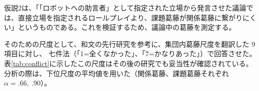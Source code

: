 \documentclass[11pt, a4paper]{jreport} %
\begin{document}




仮説2は、「「ロボットへの助言者」として指定された立場から発言させた議論では、直接立場を指定されるロールプレイより、課題葛藤が関係葛藤に繋がりにくい」というものである。これを検証するため、議論中の葛藤を測定する。

そのための尺度として、和文の先行研究\cite{村山綾20141203}を参考に、集団内葛藤尺度\cite{jehn}を翻訳した
9項目に対し、
七件法（「1=全くなかった」、「7=かなりあった」）で回答させた。表\ref{tab:conflict}に示したこの尺度はその後の研究でも妥当性が確認されている\cite{pear}。分析の際は、下位尺度の平均値を用いた（関係葛藤、課題葛藤それぞれ$\alpha=.66,~.90$）。
\end{document}
